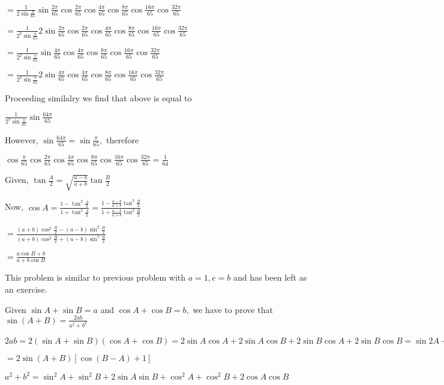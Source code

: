   $=
  \frac{1}{2\sin\frac{\pi}{65}}\sin\frac{2\pi}{65}\cos\frac{2\pi}{65}\cos\frac{4\pi}{65}\cos\frac{8\pi}{65}\cos\frac{16\pi}{65}\cos\frac{32\pi}{65}$

  $=
  \frac{1}{2^2\sin\frac{\pi}{65}}2\sin\frac{2\pi}{65}\cos\frac{2\pi}{65}\cos\frac{4\pi}{65}\cos\frac{8\pi}{65}\cos\frac{16\pi}{65}\cos\frac{32\pi}{65}$

  $=
  \frac{1}{2^2\sin\frac{\pi}{65}}\sin\frac{4\pi}{65}\cos\frac{4\pi}{65}\cos\frac{8\pi}{65}\cos\frac{16\pi}{65}\cos\frac{32\pi}{65}$

  $=
  \frac{1}{2^3\sin\frac{\pi}{65}}2\sin\frac{4\pi}{65}\cos\frac{4\pi}{65}\cos\frac{8\pi}{65}\cos\frac{16\pi}{65}\cos\frac{32\pi}{65}$

  Proceeding similalry we find that above is equal to

  $\frac{1}{2^7\sin\frac{\pi}{65}}\sin\frac{64\pi}{65}$

  However, $\sin\frac{64\pi}{65} = \sin\frac{\pi}{65},$ therefore

  $\cos\frac{\pi}{65}\cos\frac{2\pi}{65}\cos\frac{4\pi}{65}\cos\frac{8\pi}{65}\cos\frac{16\pi}{65}\cos\frac{32\pi}{65} =
  \frac{1}{64}$

\item Given, $\tan \frac{A}{2} = \sqrt{\frac{a - b}{a + b}}\tan \frac{B}{2}$

  Now, $\cos A = \frac{1 - \tan^2\frac{A}{2}}{1 + \tan^2\frac{A}{2}} = \frac{1 - \frac{a - b}{a + b}\tan^2\frac{B}{2}}{1 +
    \frac{a - b}{a + b}\tan^2\frac{B}{2}}$

  $= \frac{(a + b)\cos^2\frac{B}{2} - (a - b)\sin^2\frac{B}{2}}{(a + b)\cos^2\frac{B}{2} + (a - b)\sin^2\frac{B}{2}}$

  $= \frac{a\cos B + b}{a + b\cos B}$

\item This problem is similar to previous problem with $a = 1, e = b$ and has been left as an exercise.

\item Given $\sin A + \sin B = a$ and $\cos A + \cos B = b,$ we have to prove that $\sin(A + B) = \frac{2ab}{a^2 +
  b^2}$

  $2ab = 2(\sin A + \sin B)(\cos A + \cos B) = 2\sin A\cos A + 2\sin A\cos B + 2\sin B\cos A + 2\sin B\cos B = \sin 2A +
  \sin 2B + 2\sin(A + B)$

  $= 2\sin(A + B)[\cos(B - A) + 1]$

  $a^2 + b^2 = \sin^2A + \sin^2B + 2\sin A\sin B + \cos^2A + \cos^2B + 2\cos A\cos B$

